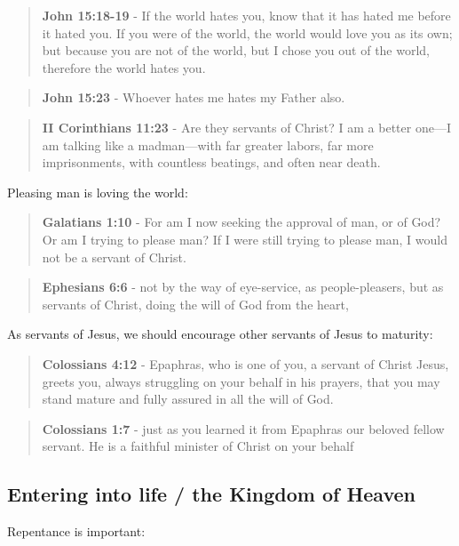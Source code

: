 \documentclass[11pt]{article}
\begin{document}
\begin{quote}
\textbf{John 15:18-19} - If the world hates you, know that it has hated me before it hated you. If you were of the world, the world would love you as its own; but because you are not of the world, but I chose you out of the world, therefore the world hates you.
\end{quote}

\begin{quote}
\textbf{John 15:23} - Whoever hates me hates my Father also.
\end{quote}

\begin{quote}
\textbf{II Corinthians 11:23} - Are they servants of Christ? I am a better one—I am talking like a madman—with far greater labors, far more imprisonments, with countless beatings, and often near death.
\end{quote}

Pleasing man is loving the world:

\begin{quote}
\textbf{Galatians 1:10} - For am I now seeking the approval of man, or of God? Or am I trying to please man? If I were still trying to please man, I would not be a servant of Christ.
\end{quote}

\begin{quote}
\textbf{Ephesians 6:6} - not by the way of eye-service, as people-pleasers, but as servants of Christ, doing the will of God from the heart,
\end{quote}

As servants of Jesus, we should encourage other servants of Jesus to maturity:

\begin{quote}
\textbf{Colossians 4:12} - Epaphras, who is one of you, a servant of Christ Jesus, greets you, always struggling on your behalf in his prayers, that you may stand mature and fully assured in all the will of God.
\end{quote}

\begin{quote}
\textbf{Colossians 1:7} - just as you learned it from Epaphras our beloved fellow servant. He is a faithful minister of Christ on your behalf
\end{quote}

\subsection{Entering into life / the Kingdom of Heaven}
\label{sec:org1a58403}
Repentance is important:
\end{document}
